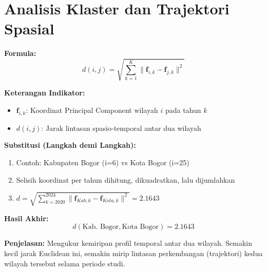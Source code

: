 \documentclass[11pt,a4paper]{article}
\begin{document}
\section{Analisis Klaster dan Trajektori Spasial}
\begin{tcolorbox}[formula_box, title={18. Jarak Euclidean antar Trajektori}]
\textbf{Formula:}
\[ d(i,j) = \sqrt{\sum_{k=1}^{K} \|\mathbf{f}_{i,k} - \mathbf{f}_{j,k}\|^2} \]

\textbf{Keterangan Indikator:}
\begin{itemize}
  \item $\mathbf{f}_{i,k}$: Koordinat Principal Component wilayah $i$ pada tahun $k$
  \item $d(i,j)$: Jarak lintasan spasio-temporal antar dua wilayah
\end{itemize}

\textbf{Substitusi (Langkah demi Langkah):}
\begin{enumerate}
  \item Contoh: Kabupaten Bogor (i=6) vs Kota Bogor (i=25)
  \item Selisih koordinat per tahun dihitung, dikuadratkan, lalu dijumlahkan
  \item $d = \sqrt{\sum_{k=2020}^{2024} \|\mathbf{f}_{Kab,k} - \mathbf{f}_{Kota,k}\|^2} = 2.1643$
\end{enumerate}

\textbf{Hasil Akhir:}
\[ d(\text{Kab.\ Bogor},\text{Kota Bogor}) = 2.1643 \]

\textbf{Penjelasan:} Mengukur kemiripan profil temporal antar dua wilayah. Semakin kecil jarak Euclidean ini, semakin mirip lintasan perkembangan (trajektori) kedua wilayah tersebut selama periode studi.
\end{tcolorbox}


\end{document}
